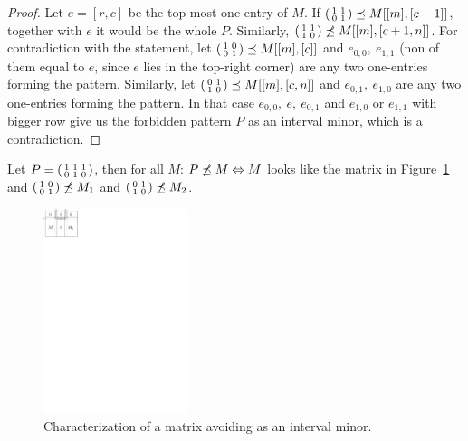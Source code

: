 \begin{proof}
Let $e=[r,c]$ be the top-most one-entry of $M$. If $\left(\begin{smallmatrix}1&1\\0&1\end{smallmatrix}\right)\preceq M[[m],[c-1]]$, together with $e$ it would be the whole $P$. Similarly, $\left(\begin{smallmatrix}1&1\\1&0\end{smallmatrix}\right)\not\preceq M[[m],[c+1,n]]$. For contradiction with the statement, let $\left(\begin{smallmatrix}1&0\\0&1\end{smallmatrix}\right)\preceq M[[m],[c]]$ and $e_{0,0},\ e_{1,1}$ (non of them equal to $e$, since $e$ lies in the top-right corner) are any two one-entries forming the pattern. Similarly, let $\left(\begin{smallmatrix}0&1\\1&0\end{smallmatrix}\right)\preceq M[[m],[c,n]]$ and $e_{0,1},\ e_{1,0}$ are any two one-entries forming the pattern. In that case $e_{0,0},\ e,\ e_{0,1}$ and $e_{1,0}$ or $e_{1,1}$ with bigger row give us the forbidden pattern $P$ as an interval minor, which is a contradiction.
\end{proof}
\begin{thm}
Let $P=\left(\begin{smallmatrix}1&1&1\\0&1&0\end{smallmatrix}\right)$, then for all $M$: $P\not\preceq M\Leftrightarrow M$ looks like the matrix in Figure~\ref{p72} and $\left(\begin{smallmatrix}1&0\\0&1\end{smallmatrix}\right)\not\preceq M_1$ and $\left(\begin{smallmatrix}0&1\\1&0\end{smallmatrix}\right)\not\preceq M_2$.
\end{thm}
\begin{figure}[h!]
\centering
\includegraphics[height=60mm]{img/p72.pdf}
\caption{Characterization of a matrix avoiding \usebox{\smlmatb} as an interval minor.}
\label{p72}
\end{figure}
